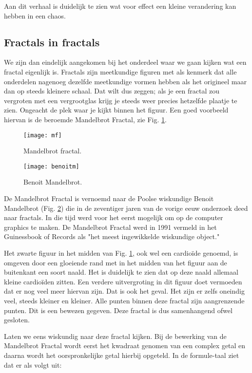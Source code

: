 \documentclass[11pt,fleqn]{book} %
\begin{document}
Aan dit verhaal is duidelijk te zien wat voor effect een kleine verandering kan hebben in een chaos.

\subsection{Fractals in fractals}
We zijn dan eindelijk aangekomen bij het onderdeel waar we gaan kijken wat een fractal eigenlijk is.
Fractals zijn meetkundige figuren met als kenmerk dat alle onderdelen nagenoeg dezelfde meetkundige vormen hebben als het origineel maar dan op steeds kleinere schaal. Dat wilt dus zeggen; als je een fractal zou vergroten met een vergrootglas krijg je steeds weer precies hetzelfde plaatje te zien. Ongeacht de plek waar je kijkt binnen het figuur. Een goed voorbeeld hiervan is de beroemde Mandelbrot Fractal, zie Fig. \ref{fig:mf}.
\begin{figure}[h]
	\centering\texttt{[image: mf]}
	\caption{Mandelbrot fractal.}
	\label{fig:mf}
\end{figure}
\begin{figure}[h]
	\centering\texttt{[image: benoitm]}
	\caption{Benoit Mandelbrot.}
	\label{fig:benoitm}
\end{figure}
De Mandelbrot Fractal is vernoemd naar de Poolse wiskundige Benoit Mandelbrot (Fig. \ref{fig:benoitm}) die in de zeventiger jaren van de vorige eeuw onderzoek deed naar fractals. In die tijd werd voor het eerst mogelijk om op de computer graphics te maken. De Mandelbrot Fractal werd in 1991 vermeld in het Guinessbook of Records als "het meest ingewikkelde wiskundige object."

Het zwarte figuur in het midden van Fig. \ref{fig:mf}, ook wel een cardioïde genoemd, is omgeven door een gloeiende rand met in het midden van het figuur aan de buitenkant een soort naald. Het is duidelijk te zien dat op deze naald allemaal kleine cardioïden zitten. Een verdere uitvergroting in dit figuur doet vermoeden dat er nog veel meer hiervan zijn. Dat is ook het geval. Het zijn er zelfs oneindig veel, steeds kleiner en kleiner. Alle punten binnen deze fractal zijn aangrenzende punten. Dit is een bewezen gegeven. Deze fractal is dus samenhangend ofwel gesloten.

Laten we eens wiskundig naar deze fractal kijken. Bij de bewerking van de Mandelbrot Fractal wordt eerst het kwadraat genomen van een complex getal en daarna wordt het oorspronkelijke getal hierbij opgeteld. In de formule-taal ziet dat er als volgt uit:
\end{document}
